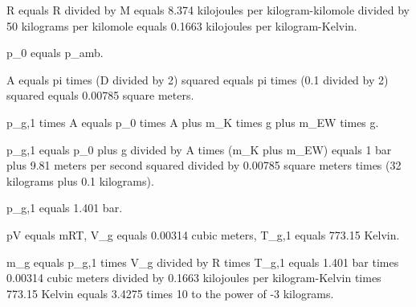 R equals R divided by M equals 8.374 kilojoules per kilogram-kilomole divided by 50 kilograms per kilomole equals 0.1663 kilojoules per kilogram-Kelvin.  

p_0 equals p_amb.  

A equals pi times (D divided by 2) squared equals pi times (0.1 divided by 2) squared equals 0.00785 square meters.  

p_g,1 times A equals p_0 times A plus m_K times g plus m_EW times g.  

p_g,1 equals p_0 plus g divided by A times (m_K plus m_EW) equals 1 bar plus 9.81 meters per second squared divided by 0.00785 square meters times (32 kilograms plus 0.1 kilograms).  

p_g,1 equals 1.401 bar.  

pV equals mRT, V_g equals 0.00314 cubic meters, T_g,1 equals 773.15 Kelvin.  

m_g equals p_g,1 times V_g divided by R times T_g,1 equals 1.401 bar times 0.00314 cubic meters divided by 0.1663 kilojoules per kilogram-Kelvin times 773.15 Kelvin equals 3.4275 times 10 to the power of -3 kilograms.